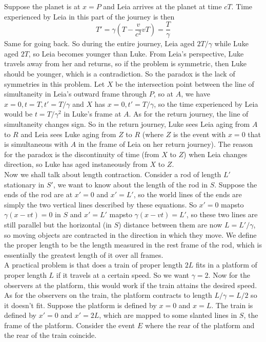 Suppose the planet is at $x=P$ and Leia arrives at the planet at time $cT$.
Time experienced by Leia in this part of the journey is then
$$T'=\gamma(T-\frac{v}{c^2}vT)=\frac{T}{\gamma}$$
Same for going back.
So during the entire journey, Leia aged $2T/\gamma$ while Luke aged $2T$, so Leia becomes younger than Luke.
From Leia's perspective, Luke travels away from her and returns, so if the problem is symmetric, then Luke should be younger, which is a contradiction.
So the paradox is the lack of symmetries in this problem.
Let $X$ be the intersection point between the line of simultaneity in Leia's outward frame through $P$, so at $A$, we have $x=0,t=T,t'=T/\gamma$ and $X$ has $x=0,t'=T/\gamma$, so the time experienced by Leia would be $t=T/\gamma^2$ in Luke's frame at $A$.
As for the return journey, the line of simultaneity changes sign.
So in the return journey, Luke sees Leia aging from $A$ to $R$ and Leia sees Luke aging from $Z$ to $R$ (where $Z$ is the event with $x=0$ that is simultaneous with $A$ in the frame of Leia on her return journey).
The reason for the paradox is the discontinuity of time (from $X$ to $Z$) when Leia changes direction, so Luke has aged instaneously from $X$ to $Z$.\\
Now we shall talk about length contraction.
Consider a rod of length $L'$ stationary in $S'$, we want to know about the length of the rod in $S$.
Suppose the ends of the rod are at $x'=0$ and $x'=L'$, so the world lines of the ends are simply the two vertical lines described by these equations.
So $x'=0$ mapsto $\gamma(x-vt)=0$ in $S$ and $x'=L'$ mapsto $\gamma(x-vt)=L'$, so these two lines are still parallel but the horizontal (in $S$) distance between them are now $L=L'/\gamma$, so moving objects are contracted in the direction in which they move.
We define the proper length to be the length measured in the rest frame of the rod, which is essentially the greatest length of it over all frames.\\
A practical problem is that does a train of proper length $2L$ fits in a platform of proper length $L$ if it travels at a certain speed.
So we want $\gamma=2$.
Now for the observers at the platform, this would work if the train attains the desired speed.
As for the observers on the train, the platform contracts to length $L/\gamma=L/2$ so it doesn't fit.
Suppose the platform is defined by $x=0$ and $x=L$.
The train is defined by $x'=0$ and $x'=2L$, which are mapped to some slanted lines in $S$, the frame of the platform.
Consider the event $E$ where the rear of the platform and the rear of the train coincide.
